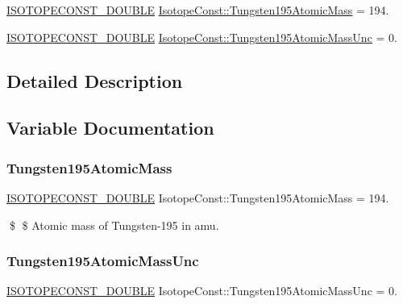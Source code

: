 \begin{DoxyCompactItemize}
\item 
\mbox{\hyperlink{group___isotope_const-_macros_ga8f45a7272ce02c0b4c65c44636ed719a}{I\+S\+O\+T\+O\+P\+E\+C\+O\+N\+S\+T\+\_\+\+D\+O\+U\+B\+LE}} \mbox{\hyperlink{group___isotope_const-_tungsten-_w195_ga4398382b7106b0fa31c2772eec129372}{Isotope\+Const\+::\+Tungsten195\+Atomic\+Mass}} = 194.
\item 
\mbox{\hyperlink{group___isotope_const-_macros_ga8f45a7272ce02c0b4c65c44636ed719a}{I\+S\+O\+T\+O\+P\+E\+C\+O\+N\+S\+T\+\_\+\+D\+O\+U\+B\+LE}} \mbox{\hyperlink{group___isotope_const-_tungsten-_w195_gafe983e65616ebb11d04259308a26bd27}{Isotope\+Const\+::\+Tungsten195\+Atomic\+Mass\+Unc}} = 0.
\end{DoxyCompactItemize}


\subsection{Detailed Description}


\subsection{Variable Documentation}
\mbox{\label{group___isotope_const-_tungsten-_w195_ga4398382b7106b0fa31c2772eec129372}} 
\subsubsection{\texorpdfstring{Tungsten195\+Atomic\+Mass}{Tungsten195AtomicMass}}
{\footnotesize\ttfamily \mbox{\hyperlink{group___isotope_const-_macros_ga8f45a7272ce02c0b4c65c44636ed719a}{I\+S\+O\+T\+O\+P\+E\+C\+O\+N\+S\+T\+\_\+\+D\+O\+U\+B\+LE}} Isotope\+Const\+::\+Tungsten195\+Atomic\+Mass = 194.}

\$ \$ Atomic mass of Tungsten-\/195 in amu. \mbox{\label{group___isotope_const-_tungsten-_w195_gafe983e65616ebb11d04259308a26bd27}} 
\subsubsection{\texorpdfstring{Tungsten195\+Atomic\+Mass\+Unc}{Tungsten195AtomicMassUnc}}
{\footnotesize\ttfamily \mbox{\hyperlink{group___isotope_const-_macros_ga8f45a7272ce02c0b4c65c44636ed719a}{I\+S\+O\+T\+O\+P\+E\+C\+O\+N\+S\+T\+\_\+\+D\+O\+U\+B\+LE}} Isotope\+Const\+::\+Tungsten195\+Atomic\+Mass\+Unc = 0.}

